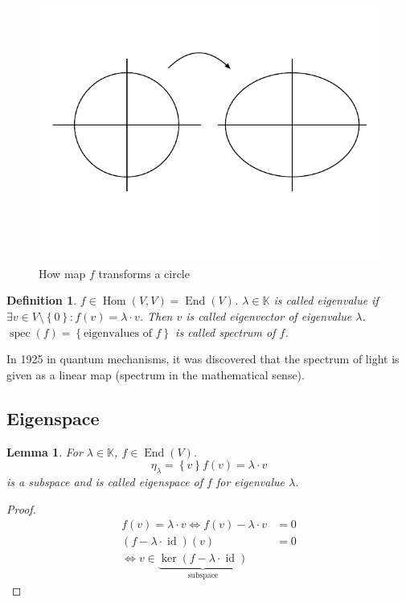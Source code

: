 \documentclass{article}
\newtheorem{definition}{Definition}  \numberwithin{definition}{section}
\newtheorem{lemma}{Lemma}  \numberwithin{lemma}{section}
\newcommand{\set}[1]{\left\{#1\right\}}
\begin{document}
\begin{figure}[t]
  \begin{center}
    \includegraphics{img/15_screwing_map.pdf}
    \caption{How map $f$ transforms a circle}
  \end{center}
\end{figure}

\begin{definition} %
  $f \in \operatorname{Hom}(V, V) = \operatorname{End}(V)$.
  $\lambda \in \mathbb K$ is called \emph{eigenvalue} if
  $\exists v \in V \setminus \set{0}: f(v) = \lambda \cdot v$.
  Then $v$ is called \emph{eigenvector} of eigenvalue $\lambda$.
  $\operatorname{spec}(f) = \set{\text{eigenvalues of } f}$ is called \emph{spectrum of $f$}.
\end{definition}

In 1925 in quantum mechanisms, it was discovered that the spectrum of light is given as a linear map (spectrum in the mathematical sense).

\subsection{Eigenspace}

\begin{lemma}
  For $\lambda \in \mathbb K$, $f \in \operatorname{End}(V)$.
  \[ \eta_{\lambda} = \set{v}{f(v) = \lambda \cdot v} \]
  is a subspace and is called eigenspace of $f$ for eigenvalue $\lambda$.
\end{lemma}
\begin{proof}
  \begin{align*}
    f(v) = \lambda \cdot v \iff f(v) - \lambda \cdot v &= 0 \\
    (f - \lambda \cdot \operatorname{id}) (v) &= 0 \\
    \iff v \in \underbrace{\operatorname{ker}(f - \lambda \cdot \operatorname{id})}_{\text{subspace}} &
  \end{align*}
\end{proof}
\end{document}
